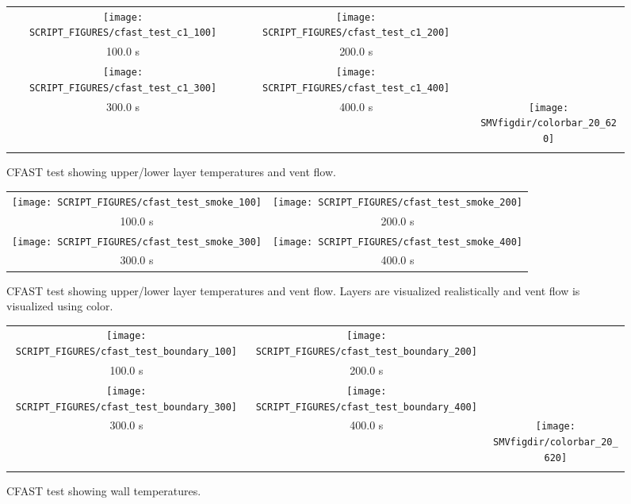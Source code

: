 \documentclass[11pt,twoside]{book}
\begin{document}
\begin{figure}[bph]
\begin{center}
\begin{tabular}{ccc}
\texttt{[image: SCRIPT\_FIGURES/cfast\_test\_c1\_100]}&
\texttt{[image: SCRIPT\_FIGURES/cfast\_test\_c1\_200]}\\
100.0 s&200.0 s\\
\texttt{[image: SCRIPT\_FIGURES/cfast\_test\_c1\_300]}&
\texttt{[image: SCRIPT\_FIGURES/cfast\_test\_c1\_400]}\\
300.0 s&400.0 s
&\raisebox{0.0ex}[0pt]{\texttt{[image: \\SMVfigdir/colorbar\_20\_620]}}\\
\\
\end{tabular}
\end{center}
\caption{CFAST test showing upper/lower layer temperatures and vent flow.}
\label{figcfast}%
\end{figure}

\begin{figure}[bph]
\begin{center}
\begin{tabular}{cc}
\texttt{[image: SCRIPT\_FIGURES/cfast\_test\_smoke\_100]}&
\texttt{[image: SCRIPT\_FIGURES/cfast\_test\_smoke\_200]}\\
100.0 s&200.0 s\\
\texttt{[image: SCRIPT\_FIGURES/cfast\_test\_smoke\_300]}&
\texttt{[image: SCRIPT\_FIGURES/cfast\_test\_smoke\_400]}\\
300.0 s&400.0 s\\
\end{tabular}
\end{center}
\caption{CFAST test showing upper/lower layer temperatures and vent flow.
Layers are visualized realistically and vent flow
is visualized using color.}
\label{figcfastsmoke}%
\end{figure}

\begin{figure}[bph]
\begin{center}
\begin{tabular}{ccc}
\texttt{[image: SCRIPT\_FIGURES/cfast\_test\_boundary\_100]}&
\texttt{[image: SCRIPT\_FIGURES/cfast\_test\_boundary\_200]}\\
100.0 s&200.0 s\\
\texttt{[image: SCRIPT\_FIGURES/cfast\_test\_boundary\_300]}&
\texttt{[image: SCRIPT\_FIGURES/cfast\_test\_boundary\_400]}\\
300.0 s&400.0 s
&\raisebox{0.0ex}[0pt]{\texttt{[image: \\SMVfigdir/colorbar\_20\_620]}}\\
\\
\end{tabular}
\end{center}
\caption{CFAST test showing wall temperatures.}
\label{figcfastboundary}%
\end{figure}
\end{document}
